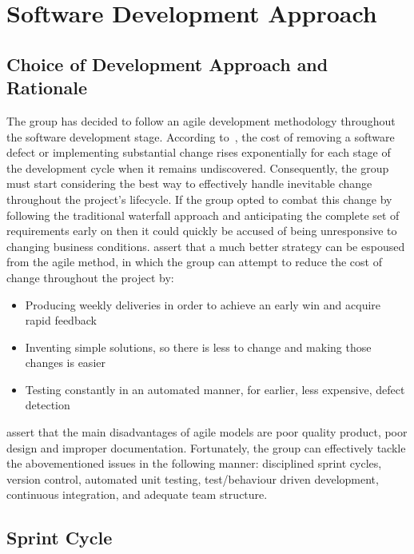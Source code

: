 \section{Software Development Approach}

\subsection{Choice of Development Approach and Rationale}

The group has decided to follow an agile development methodology throughout the software development stage. According to~\textcite{book:software_engineering_economics}, the cost of removing a software defect or implementing substantial change rises exponentially for each stage of the development cycle when it remains undiscovered. Consequently, the group must start considering the best way to effectively handle inevitable change throughout the project’s lifecycle. If the group opted to combat this change by following the traditional waterfall approach and anticipating the complete set of requirements early on then it could quickly be accused of being unresponsive to changing business conditions. \textcite{art:agile_business_innovation} assert that a much better strategy can be espoused from the agile method, in which the group can attempt to reduce the cost of change throughout the project by:

\begin{itemize}
  \item Producing weekly deliveries in order to achieve an early win and acquire rapid feedback
  \item Inventing simple solutions, so there is less to change and making those changes is easier
  \item Testing constantly in an automated manner, for earlier, less expensive, defect detection
\end{itemize}

\textcite{art:adaptive_sdpm} assert that the main disadvantages of agile models are poor quality product, poor design and improper documentation. Fortunately, the group can effectively tackle the abovementioned issues in the following manner: disciplined sprint cycles, version control, automated unit testing, test/behaviour driven development, continuous integration, and adequate team structure.

\subsection{Sprint Cycle}

